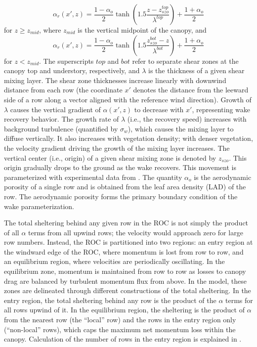 \begin{equation}\label{wakeAlpha}
\alpha_r(x',z) = \frac{1-\alpha_{o}}{2}\tanh\left(1.5\frac{z-z_{szo}^{top}}{\lambda^{top}}\right) + \frac{1+\alpha_{o}}{2}
\end{equation} 
for $z \geq z_{mid}$, where $z_{mid}$ is the vertical midpoint of the canopy, and
\begin{equation}
\alpha_r(x',z) = \frac{1-\alpha_{o}}{2}\tanh\left(1.5\frac{z_{szo}^{bot}-z}{\lambda^{bot}}\right) + \frac{1+\alpha_{o}}{2}
\end{equation}
for $z < z_{mid}$. The superscripts $top$ and $bot$ refer to separate shear zones at the canopy top and understory, respectively, and $\lambda$ is the thickness of a given shear mixing layer. The shear zone thicknesses increase linearly with downwind distance from each row (the coordinate $x'$ denotes the distance from the leeward side of a row along a vector aligned with the reference wind direction). Growth of $\lambda$ causes the vertical gradient of $\alpha(x',z)$ to decrease with $x'$, representing wake recovery behavior. The growth rate of $\lambda$ (i.e., the recovery speed) increases with background turbulence (quantified by $\sigma_w$), which causes the mixing layer to diffuse vertically. It also increases with vegetation density; with denser vegetation, the velocity gradient driving the growth of the mixing layer increases.
The vertical center (i.e., origin) of a given shear mixing zone is denoted by $z_{szo}$. This origin gradually drops to the ground as the wake recovers. This movement is parameterized with experimental data from \cite{torkelson2022momentum}.
The quantity $\alpha_o$ is the aerodynamic porosity of a single row and is obtained from the leaf area density (LAD) of the row. The aerodynamic porosity forms the primary boundary condition of the wake parameterization.

The total sheltering behind any given row in the ROC is not simply the product of all $\alpha$ terms from all upwind rows; the velocity would approach zero for large row numbers. Instead, the ROC is partitioned into two regions: an entry region at the windward edge of the ROC, where momentum is lost from row to row, and an equilibrium region, where velocities are periodically oscillating. In the equilibrium zone, momentum is maintained from row to row as losses to canopy drag are balanced by turbulent momentum flux from above.
In the model, these zones are delineated through different constructions of the total sheltering. In the entry region, the total sheltering behind any row is the product of the $\alpha$ terms for all rows upwind of it. In the equilibrium region, the sheltering is the product of $\alpha$ from the nearest row (the ``local'' row) and the rows in the entry region only (``non-local'' rows), which caps the maximum net momentum loss within the canopy. Calculation of the number of rows in the entry region is explained in \cite{ulmer2023fast}.

